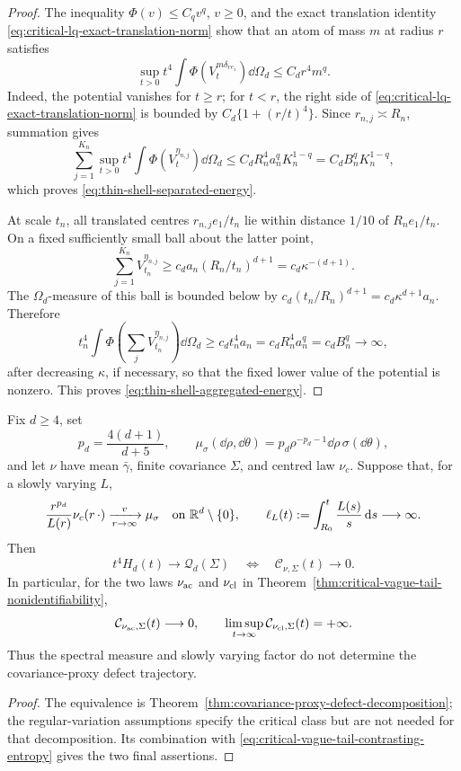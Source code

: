 \begin{proof}
The inequality \(\Phi(v)\le C_qv^q\), \(v\ge0\), and the exact translation
identity \eqref{eq:critical-lq-exact-translation-norm} show that an atom of
mass \(m\) at radius \(r\) satisfies
\[
 \sup_{t>0}t^4\int\Phi(V_t^{m\delta_{re_1}})\dd\Omega_d
 \le C_dr^4m^q.
\]
Indeed, the potential vanishes for \(t\ge r\); for \(t<r\), the right side
of \eqref{eq:critical-lq-exact-translation-norm} is bounded by
\(C_d\{1+(r/t)^4\}\).  Since \(r_{n,j}\asymp R_n\), summation gives
\[
 \sum_{j=1}^{K_n}\sup_{t>0}t^4
 \int\Phi(V_t^{\eta_{n,j}})\dd\Omega_d
 \le C_dR_n^4a_n^qK_n^{1-q}
 =C_dB_n^qK_n^{1-q},
\]
which proves \eqref{eq:thin-shell-separated-energy}.

At scale \(t_n\), all translated centres \(r_{n,j}e_1/t_n\) lie within
distance \(1/10\) of \(R_ne_1/t_n\).  On a fixed sufficiently small ball
about the latter point,
\[
 \sum_{j=1}^{K_n}V_{t_n}^{\eta_{n,j}}
 \ge c_da_n(R_n/t_n)^{d+1}=c_d\kappa^{-(d+1)}.
\]
The \(\Omega_d\)-measure of this ball is bounded below by
\(c_d(t_n/R_n)^{d+1}=c_d\kappa^{d+1}a_n\).  Therefore
\[
 t_n^4\int\Phi\!\left(\sum_jV_{t_n}^{\eta_{n,j}}\right)\dd\Omega_d
 \ge c_dt_n^4a_n
 =c_dR_n^4a_n^q=c_dB_n^q\longrightarrow\infty,
\]
after decreasing \(\kappa\), if necessary, so that the fixed lower value of
the potential is nonzero.  This proves
\eqref{eq:thin-shell-aggregated-energy}.
\end{proof}

\begin{corollary}
\label{cor:critical-rv-proxy-characterization}
Fix \(d\ge4\), set
\[
 p_d=\frac{4(d+1)}{d+5},
 \qquad
 \mu_\sigma(\dd\rho,\dd\theta)
 =p_d\rho^{-p_d-1}\dd\rho\,\sigma(\dd\theta),
\]
and let \(\nu\) have mean \(\bar\gamma\), finite covariance \(\Sigma\), and
centred law \(\nu_c\).  Suppose that, for a slowly varying \(L\),
\[
 \frac{r^{p_d}}{L(r)}\nu_c(r\,\mathord\cdot)
 \xrightarrow[r\to\infty]{v}\mu_\sigma
 \quad\text{on }\mathbb{R}^d\setminus\{0\},
 \qquad
 \ell_L(t):=\int_{R_0}^t\frac{L(s)}s\,\mathrm{d} s\longrightarrow\infty.
\]
Then
\[
 t^4H_d(t)\longrightarrow\mathcal Q_d(\Sigma)
 \quad\Longleftrightarrow\quad
 \mathcal C_{\nu,\Sigma}(t)\longrightarrow0.
\]
In particular, for the two laws \(\nu_{\rm ac}\) and \(\nu_{\rm cl}\) in
Theorem~\ref{thm:critical-vague-tail-nonidentifiability},
\[
 \mathcal C_{\nu_{\rm ac},\Sigma}(t)\longrightarrow0,
 \qquad
 \limsup_{t\to\infty}\mathcal C_{\nu_{\rm cl},\Sigma}(t)=+\infty.
\]
Thus the spectral measure and slowly varying factor do not determine the
covariance-proxy defect trajectory.
\end{corollary}

\begin{proof}
The equivalence is Theorem~\ref{thm:covariance-proxy-defect-decomposition};
the regular-variation assumptions specify the critical class but are not
needed for that decomposition.  Its combination with
\eqref{eq:critical-vague-tail-contrasting-entropy} gives the two final
assertions.
\end{proof}
